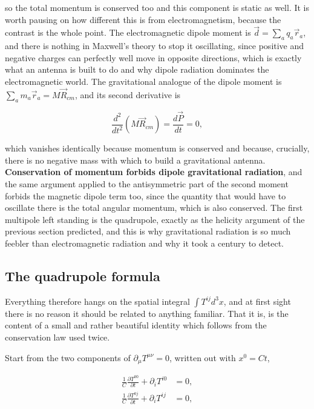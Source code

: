         so the total momentum is conserved too and this component is static as well. It is worth pausing on how different this is from electromagnetism, because the contrast is the whole point. The electromagnetic dipole moment is $\Vec{d}=\sum_a q_a\Vec{r}_a$, and there is nothing in Maxwell's theory to stop it oscillating, since positive and negative charges can perfectly well move in opposite directions, which is exactly what an antenna is built to do and why dipole radiation dominates the electromagnetic world. The gravitational analogue of the dipole moment is $\sum_a m_a\Vec{r}_a = M\Vec{R}_{cm}$, and its second derivative is

        \begin{equation}
            \frac{d^2}{dt^2}\left(M\Vec{R}_{cm}\right) = \frac{d\Vec{P}}{dt} = 0,
        \end{equation}

        which vanishes identically because momentum is conserved and because, crucially, there is no negative mass with which to build a gravitational antenna. \textbf{Conservation of momentum forbids dipole gravitational radiation}, and the same argument applied to the antisymmetric part of the second moment forbids the magnetic dipole term too, since the quantity that would have to oscillate there is the total angular momentum, which is also conserved. The first multipole left standing is the quadrupole, exactly as the helicity argument of the previous section predicted, and this is why gravitational radiation is so much feebler than electromagnetic radiation and why it took a century to detect.

    \subsection{The quadrupole formula}

        Everything therefore hangs on the spatial integral $\int T^{ij}d^3x$, and at first sight there is no reason it should be related to anything familiar. That it is, is the content of a small and rather beautiful identity which follows from the conservation law used twice.

        Start from the two components of $\partial_{\mu}T^{\mu\nu}=0$, written out with $x^0=Ct$,

        \begin{align}
            \frac{1}{C}\frac{\partial T^{00}}{\partial t} + \partial_iT^{i0} &= 0,\\
            \frac{1}{C}\frac{\partial T^{0j}}{\partial t} + \partial_iT^{ij} &= 0,
        \end{align}


